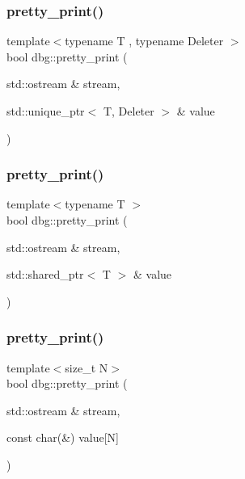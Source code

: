 \mbox{\label{namespacedbg_a6cbcb99c1fdd640925d80c390af3954a}} 
\subsubsection{\texorpdfstring{pretty\+\_\+print()}{pretty\_print()}\hspace{0.1cm}{\footnotesize\ttfamily [7/19]}}
{\footnotesize\ttfamily template$<$typename T , typename Deleter $>$ \\
bool dbg\+::pretty\+\_\+print (\begin{DoxyParamCaption}\item[{std\+::ostream \&}]{stream,  }\item[{std\+::unique\+\_\+ptr$<$ T, Deleter $>$ \&}]{value }\end{DoxyParamCaption})\hspace{0.3cm}{\ttfamily [inline]}}

\mbox{\label{namespacedbg_ae36a726fc12c4b6c13878e051f4f3ad7}} 
\subsubsection{\texorpdfstring{pretty\+\_\+print()}{pretty\_print()}\hspace{0.1cm}{\footnotesize\ttfamily [8/19]}}
{\footnotesize\ttfamily template$<$typename T $>$ \\
bool dbg\+::pretty\+\_\+print (\begin{DoxyParamCaption}\item[{std\+::ostream \&}]{stream,  }\item[{std\+::shared\+\_\+ptr$<$ T $>$ \&}]{value }\end{DoxyParamCaption})\hspace{0.3cm}{\ttfamily [inline]}}

\mbox{\label{namespacedbg_adb407af036065563d2e8ef131305475a}} 
\subsubsection{\texorpdfstring{pretty\+\_\+print()}{pretty\_print()}\hspace{0.1cm}{\footnotesize\ttfamily [9/19]}}
{\footnotesize\ttfamily template$<$size\+\_\+t N$>$ \\
bool dbg\+::pretty\+\_\+print (\begin{DoxyParamCaption}\item[{std\+::ostream \&}]{stream,  }\item[{const char(\&)}]{value\mbox{[}\+N\mbox{]} }\end{DoxyParamCaption})\hspace{0.3cm}{\ttfamily [inline]}}

